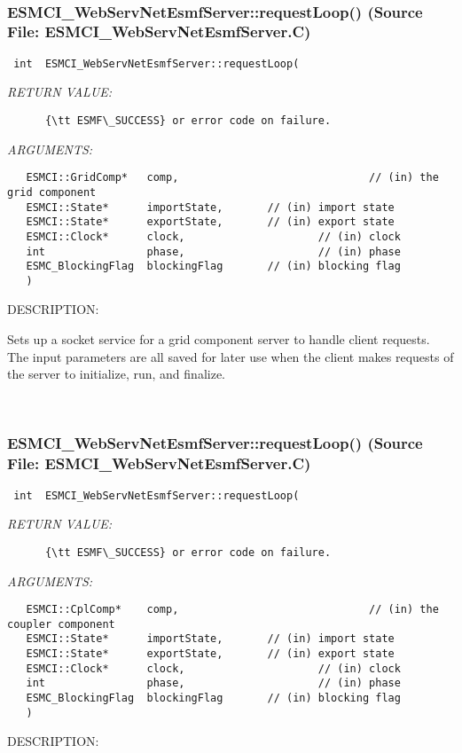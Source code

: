  
\mbox{}\hrulefill\
 
\subsubsection{ESMCI\_WebServNetEsmfServer::requestLoop() (Source File: ESMCI\_WebServNetEsmfServer.C)}


  
\begin{verbatim} int  ESMCI_WebServNetEsmfServer::requestLoop(\end{verbatim}{\em RETURN VALUE:}
\begin{verbatim}      {\tt ESMF\_SUCCESS} or error code on failure.\end{verbatim}{\em ARGUMENTS:}
\begin{verbatim}   ESMCI::GridComp*   comp,                              // (in) the grid component
   ESMCI::State*      importState,       // (in) import state
   ESMCI::State*      exportState,       // (in) export state
   ESMCI::Clock*      clock,                     // (in) clock
   int                phase,                     // (in) phase
   ESMC_BlockingFlag  blockingFlag       // (in) blocking flag
   )\end{verbatim}
{\sf DESCRIPTION:\\ }


      Sets up a socket service for a grid component server to handle client
      requests.  The input parameters are all saved for later use when the
      client makes requests of the server to initialize, run, and finalize.
   
 
\mbox{}\hrulefill\
 
\subsubsection{ESMCI\_WebServNetEsmfServer::requestLoop() (Source File: ESMCI\_WebServNetEsmfServer.C)}


  
\begin{verbatim} int  ESMCI_WebServNetEsmfServer::requestLoop(\end{verbatim}{\em RETURN VALUE:}
\begin{verbatim}      {\tt ESMF\_SUCCESS} or error code on failure.\end{verbatim}{\em ARGUMENTS:}
\begin{verbatim}   ESMCI::CplComp*    comp,                              // (in) the coupler component
   ESMCI::State*      importState,       // (in) import state
   ESMCI::State*      exportState,       // (in) export state
   ESMCI::Clock*      clock,                     // (in) clock
   int                phase,                     // (in) phase
   ESMC_BlockingFlag  blockingFlag       // (in) blocking flag
   )\end{verbatim}
{\sf DESCRIPTION:\\ }


